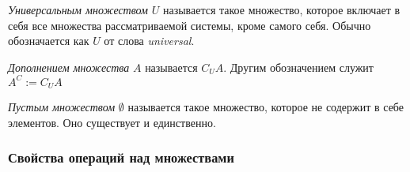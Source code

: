 \begin{definition}
    \textit{Универсальным множеством} $U$ называется такое множество, которое включает в себя все множества рассматриваемой системы, кроме самого себя. Обычно обозначается как $U$ от слова \textit{universal}.
\end{definition}

\begin{definition}
    \textit{Дополнением множества} $A$ называется $C_U A$. Другим обозначением служит $A^C := C_U A$
\end{definition}

\begin{definition}
    \textit{Пустым множеством} $\emptyset$ называется такое множество, которое не содержит в себе элементов. Оно существует и единственно.
\end{definition}


\subsubsection{Свойства операций над множествами}

